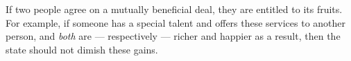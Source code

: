 If two people agree on a mutually beneficial deal, they are entitled to its fruits.
For example, if someone has a special talent and offers these services to another person, and \emph{both} are --- respectively --- richer and happier as a result, then the state should not dimish these gains.
